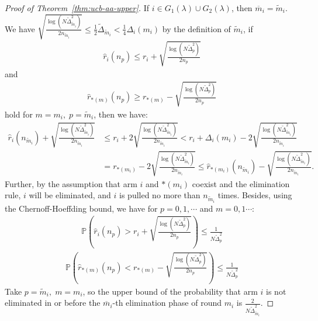 \documentclass[
  12pt]{article}
\begin{document}
\begin{proof}[Proof of Theorem~\ref{thm:ucb-aa-upper}]
If $i\in G_1(\lambda)\cup G_2(\lambda)$, then $\overline{m}_i=\tilde{m}_i$. We have  \( \sqrt{\frac{\log(N \tilde{\Delta}_{\tilde{m}_i}^2)}{2n_{\tilde{m}_i}}} \leq \frac{1}{2}\tilde{\Delta}_{\tilde{m}_i} < \frac{1}{4}\Delta_i(m_i) \) by the definition of $\tilde{m}_i$, if \begin{align}
    \hat{r}_i(n_p) \leq r_i + \sqrt{\frac{\log(N \tilde{\Delta}_{p}^2)}{2n_{p}}} \label{suboptimal is bad A-3}
\end{align}
and  
\begin{align}
    \hat{r}_{*(m)}(n_p) \geq r_{*(m)} - \sqrt{\frac{\log(N \tilde{\Delta}_{p}^2)}{2n_{p}}} \label{optimal is good A-3}
\end{align}
hold for $m = m_i,\; p=\tilde{m}_i$, then we have:  
\begin{align*}
    \hat{r}_i(n_{\tilde{m}_i}) + \sqrt{\frac{\log(N \tilde{\Delta}_{\tilde{m}_i}^2)}{2n_{\tilde{m}_i}}} &\leq r_i + 2\sqrt{\frac{\log(N \tilde{\Delta}_{\tilde{m}_i}^2)}{2n_{\tilde{m}_i}}} < r_i + \Delta_i(m_i) - 2\sqrt{\frac{\log(N \tilde{\Delta}_{\tilde{m}_i}^2)}{2n_{\tilde{m}_i}}} \\
    &= r_{*(m_i)} - 2\sqrt{\frac{\log(N \tilde{\Delta}_{\tilde{m}_i}^2)}{2n_{\tilde{m}_i}}} \leq \hat{r}_{*(m_i)}(n_{\tilde{m}_i}) - \sqrt{\frac{\log(N \tilde{\Delta}_{\tilde{m}_i}^2)}{2n_{\tilde{m}_i}}}.
\end{align*}
Further, by the assumption that arm $i$ and $*(m_i)$ coexist and the elimination rule, \( i \) will be eliminated, and $i$ is pulled no more than $n_{\tilde{m}_i}$ times. Besides, using the Chernoff-Hoeffding bound, we have for $p=0,1,\cdots$ and $m=0,1\cdots$:
\begin{align}
    \mathbb{P}\left( \hat{r}_i(n_p) > r_i + \sqrt{\frac{\log(N \tilde{\Delta}_{p}^2)}{2n_{p}}} \right)    \leq \frac{1}{N \tilde{\Delta}_{p}^2}
    \label{suboptimal is good A-3}
\end{align}
\begin{align}
    \mathbb{P}\left( \hat{r}_{*(m)}(n_p) < r_{*(m)} - \sqrt{\frac{\log(N \tilde{\Delta}_{p}^2)}{2n_{p}}} \right) \leq \frac{1}{N \tilde{\Delta}_{p}^2} 
    \label{optimal is bad A-3}
\end{align}
Take $p=\tilde{m}_i,\; m=m_i$, so the upper bound of the probability that arm \( i \) is not eliminated in or before the $\overline{m}_i$-th elimination phase of round $m_i$ is $\frac{2}{N \tilde{\Delta}_{\tilde{m}_i}^2}$.


\end{proof}
\end{document}
